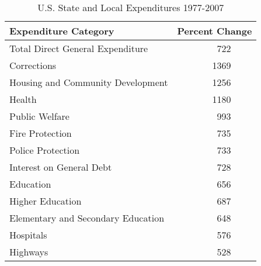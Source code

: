 \begin{table}[t]
\begin{center}
\caption{U.S. State and Local Expenditures 1977-2007}
\vspace{0.1cm}
\begin{tabular}{lrr}
  \hline
  Expenditure Category & \multicolumn{2}{c}{Percent Change}  \\ \hline
  Total Direct General Expenditure & \hspace{1cm} 722 & \\
  Corrections & 1369 & \\
  Housing and Community Development & 1256 & \\
  Health & 1180 & \\
  Public Welfare & 993 & \\
  Fire Protection & 735 & \\
  Police Protection & 733 & \\
  Interest on General Debt & 728 \\
  Education & 656 & \\
  \hspace{0.5cm} Higher Education & 687 & \\
  \hspace{0.5cm} Elementary and Secondary Education & 648 & \\
  Hospitals & 576 & \\
  Highways & 528 & \\
  \hline
\end{tabular}
\end{center}
\end{table}

